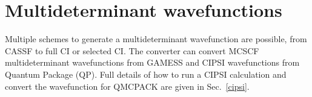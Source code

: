 \section{Multideterminant wavefunctions}
\label{sec:multideterminants}
Multiple schemes to generate a multideterminant wavefunction are
possible, from CASSF to full CI or selected CI. The \qmcpack converter can
convert MCSCF multideterminant wavefunctions from
GAMESS\cite{schmidt93} and CIPSI\cite{caffarel2013} wavefunctions from
Quantum Package\cite{QP} (QP). Full details of how to run a CIPSI
calculation and convert the wavefunction for QMCPACK are given in 
Sec.~\ref{cipsi}.

